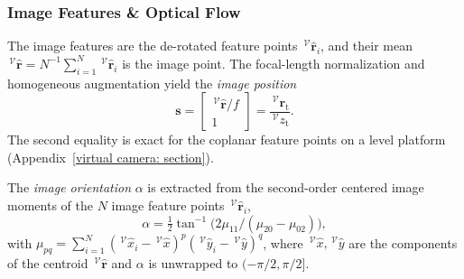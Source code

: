 \documentclass{IEEEtaes}
\begin{document}
\subsubsection{Image Features \& Optical Flow} \label{image features: section}
The image features are the de-rotated feature points $\,^\mathcal{V}\hat{\boldsymbol{r}}_i$, and their mean $\,^\mathcal{V}\hat{\boldsymbol{r}}=N^{-1}\sum_{i=1}^{N}\,^\mathcal{V}\hat{\boldsymbol{r}}_i$ is the image point. The focal-length normalization and homogeneous augmentation yield the \emph{image position}
\begin{equation} \label{image position: equation}
    \boldsymbol{s} = \begin{bmatrix}\,^\mathcal{V}\hat{\boldsymbol{r}}/f\\ 1\end{bmatrix} = \frac{\,^\mathcal{V}\boldsymbol{r}_\text{t}}{\,^\mathcal{V}z_\text{t}}.
\end{equation}
The second equality is exact for the coplanar feature points on a level platform (Appendix~\ref{virtual camera: section}).

The \emph{image orientation} $\alpha$ is extracted from the second-order centered image moments of the $N$ image feature points $\,^\mathcal{V}\hat{\boldsymbol{r}}_i$,
\begin{equation} \label{image orientation: equation}
    \alpha = \tfrac12\tan^{-1}\!\big(2\mu_{11}/(\mu_{20}-\mu_{02})\big),
\end{equation}
with $\mu_{pq} = \sum_{i=1}^{N}(\,^\mathcal{V}\hat{x}_i - \,^\mathcal{V}\hat{x})^p(\,^\mathcal{V}\hat{y}_i - \,^\mathcal{V}\hat{y})^q$, where $\,^\mathcal{V}\hat{x},\,^\mathcal{V}\hat{y}$ are the components of the centroid $\,^\mathcal{V}\hat{\boldsymbol{r}}$ and $\alpha$ is unwrapped to $(-\pi/2,\pi/2]$.
\end{document}
